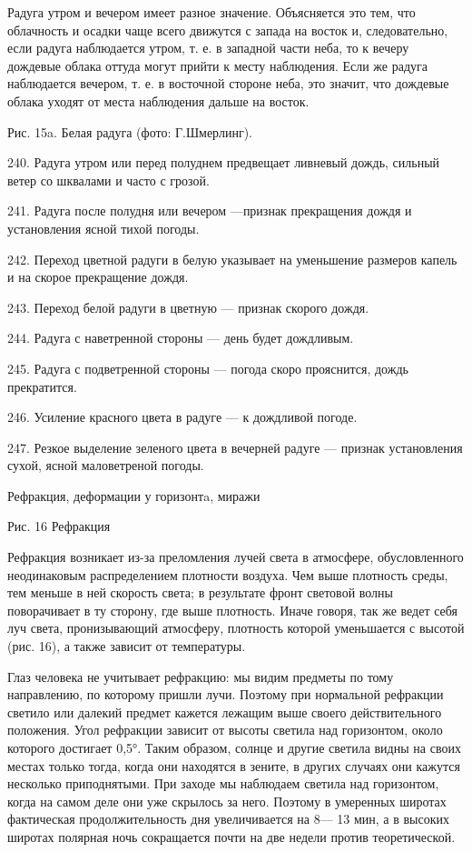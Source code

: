 Радуга утром и вечером имеет разное значение. Объясняется это тем, что облачность и осадки чаще всего движутся с запада на восток и, следовательно, если радуга наблюдается утром, т. е. в западной части неба, то к вечеру дождевые облака оттуда могут прийти к месту наблюдения. Если же радуга наблюдается вечером, т. е. в восточной стороне неба, это значит, что дождевые облака уходят от места наблюдения дальше на восток.


Рис. 15a. Белая радуга (фото: Г.Шмерлинг).

240. Радуга утром или перед полуднем предвещает ливневый дождь, сильный ветер со шквалами и часто с грозой.

241. Радуга после полудня или вечером —признак прекращения дождя и установления ясной тихой погоды.

242. Переход цветной радуги в белую указывает на уменьшение размеров капель и на скорое прекращение дождя.

243. Переход белой радуги в цветную — признак скорого дождя.

244. Радуга с наветренной стороны — день будет дождливым.

245. Радуга с подветренной стороны — погода скоро прояснится, дождь прекратится.

246. Усиление красного цвета в радуге — к дождливой погоде.

247. Резкое выделение зеленого цвета в вечерней радуге — признак установления сухой, ясной маловетреной погоды.

Рефракция, деформации у горизонтa, миражи

Рис. 16 Рефракция

Рефракция возникает из-за преломления лучей света в атмосфере, обусловленного неодинаковым распределением плотности воздуха. Чем выше плотность среды, тем меньше в ней скорость света; в результате фронт световой волны поворачивает в ту сторону, где выше плотность. Иначе говоря, так же ведет себя луч света, пронизывающий атмосферу, плотность которой уменьшается с высотой (рис. 16), а также зависит от температуры.

Глаз человека не учитывает рефракцию: мы видим предметы по тому направлению, по которому пришли лучи. Поэтому при нормальной рефракции светило или далекий предмет кажется лежащим выше своего действительного положения. Угол рефракции зависит от высоты светила над горизонтом, около которого достигает 0,5°. Таким образом, солнце и другие светила видны на своих местах только тогда, когда они находятся в зените, в других случаях они кажутся несколько приподнятыми. При заходе мы наблюдаем светила над горизонтом, когда на самом деле они уже скрылось за него. Поэтому в умеренных широтах фактическая продолжительность дня увеличивается на 8— 13 мин, а в высоких широтах полярная ночь сокращается почти на две недели против теоретической.


